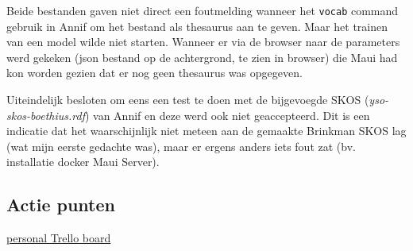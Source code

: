 \documentclass{article}
\begin{document}
Beide bestanden gaven niet direct een foutmelding wanneer het \texttt{vocab} command gebruik in Annif om het bestand als thesaurus aan te geven. Maar het trainen van een model wilde niet starten. Wanneer er via de browser naar de parameters werd gekeken (json bestand op de achtergrond, te zien in browser) die Maui had kon worden gezien dat er nog geen thesaurus was opgegeven. 

Uiteindelijk besloten om eens een test te doen met de bijgevoegde SKOS (\textit{yso-skos-boethius.rdf}) van Annif en deze werd ook niet geaccepteerd. Dit is een indicatie dat het waarschijnlijk niet meteen aan de gemaakte Brinkman SKOS lag (wat mijn eerste gedachte was), maar er ergens anders iets fout zat (bv. installatie docker Maui Server).


\subsection{Actie punten}
\href{https://trello.com/b/Hy6Ol32K}{personal Trello board}
\end{document}
